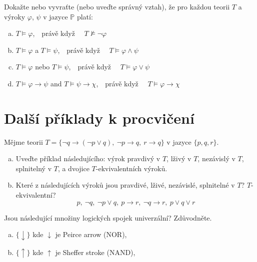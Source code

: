 \begin{problem}

    Dokažte nebo vyvraťte (nebo uveďte správný vztah), že pro každou teorii $T$ a výroky $\varphi$, $\psi$ v jazyce $\mathbb{P}$ platí:
    \begin{enumerate}[(a)]
        \item $T \models \varphi$,\ \  právě když \ \ $T \not\models \neg \varphi$
        \item $T \models \varphi$ a $T \models \psi$,\ \ právě když \ \ $T \models \varphi \wedge \psi$
        \item $T \models \varphi$ nebo $T \models \psi$,\ \ právě když \ \ $T \models \varphi \vee \psi$
        \item $T \models \varphi \to \psi$ and $T \models \psi \to \chi$,\ \ právě když \ \ $T \models \varphi \to \chi$
    \end{enumerate}

    \begin{solution}
            
    \end{solution}
    
\end{problem}


\section*{Další příklady k procvičení}


\begin{problem}
        
    Mějme teorii $T=\{\neg q \to (\neg p \vee q),\ \neg p \to q,\ r \to q\}$ v jazyce $\{p, q, r\}$.
    \begin{enumerate}[(a)]
        \item Uveďte příklad následujícího: výrok pravdivý v $T$, lživý v $T$, nezávislý v $T$, splnitelný v $T$, a dvojice $T$-ekvivalentních výroků.
        \item Které z následujících výroků jsou pravdivé, lživé, nezávislé, splnitelné v $T$? $T$-ekvivalentní? 
        $$
        p, \ \neg q, \ \neg p\vee q, \ p\to r,\ \neg q\to r, \ p\vee q\vee r
        $$
    \end{enumerate}

\end{problem}


\begin{problem} 
    
    Jsou následující množiny logických spojek univerzální? Zdůvodněte.
    \begin{enumerate}[(a)]
        \item $\{\downarrow\}$ kde $\downarrow$ je Peirce arrow (NOR),
        \item $\{\uparrow\}$ kde $\uparrow$ je Sheffer stroke (NAND),
    \end{enumerate}

\end{problem}


